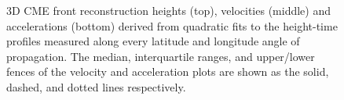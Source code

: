 \documentclass[preprint2]{aastex}
\begin{document}
\begin{figure}[!hp]
\caption{3D CME front reconstruction heights (top), velocities (middle) and accelerations (bottom) derived from quadratic fits to the height-time profiles measured along every latitude and longitude angle of propagation. The median, interquartile ranges, and upper/lower fences of the velocity and acceleration plots are shown as the solid, dashed, and dotted lines respectively.}
\label{kins_inspect}
\end{figure}
\end{document}
